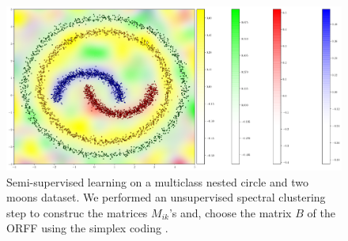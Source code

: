 {\begin{center}
\end{center}}
\begin{figure}
    \centering
    \includegraphics[width=\textwidth]{./gfx/nestedtwomoons.pdf}
    \caption[\acs{ORFF} multiclass semi-supervised]{Semi-supervised learning
    on a multiclass nested circle and two moons dataset. We performed an 
    unsupervised spectral clustering \citep{von2007tutorial} step to construc
    the matrices $M_{ik}$'s and, choose the matrix $B$ of the \acs{ORFF} using
    the simplex coding \citep{mroueh2012multiclass}.}
\end{figure}
